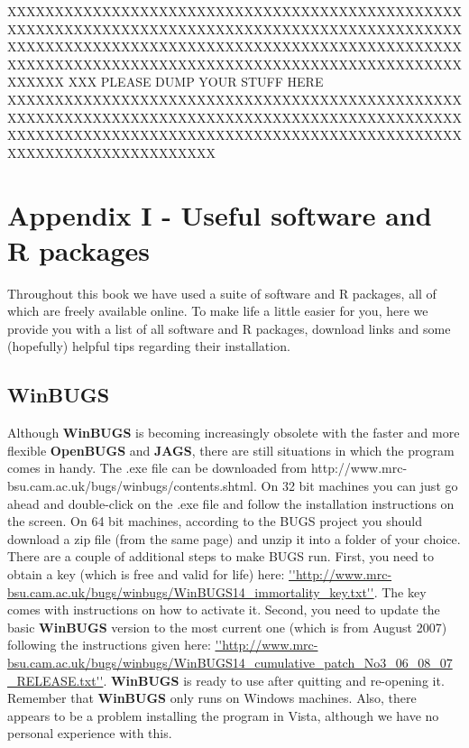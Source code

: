 XXXXXXXXXXXXXXXXXXXXXXXXXXXXXXXXXXXXXXXXXXXXXXXXXXXXXXXXXXXXXXXXXXXXXXXXXXXXXXXXXXXXXXXXXXXXXXXXXXXXXXXXXXXXXXXXXXXXXXXXXXXXXXXXXXXXXXXXXXXXXXXXXXXXXXXXXXXXXXXXXXXXXXXXXXXXXXXXXXXXXXXXXXXXXXXXXXXXXX
XXX PLEASE DUMP YOUR STUFF HERE XXXXXXXXXXXXXXXXXXXXXXXXXXXXXXXXXXXXXXXXXXXXXXXXXXXXXXXXXXXXXXXXXXXXXXXXXXXXXXXXXXXXXXXXXXXXXXXXXXXXXXXXXXXXXXXXXXXXXXXXXXXXXXXXXXXXXXXXXXXXXXXXXXXXXXXXXXXXXXXXXXXXXX



\chapter{Appendix I - Useful software and R packages}
\label{chapt.app1}

\vspace{.3in}

Throughout this book we have used a suite of software and R packages, all of which are freely available online. To make life a little easier for you, here we provide you with a list of all software and R packages, download links and some (hopefully) helpful tips regarding their installation.  


\section{WinBUGS}
Although {\bf WinBUGS} \citep{gilks_etal:1994} is becoming increasingly obsolete with the faster and more flexible {\bf OpenBUGS} and {\bf JAGS}, there are still situations in which the program comes in handy.  
The .exe file can be downloaded from http://www.mrc-bsu.cam.ac.uk/bugs/winbugs/contents.shtml. On 32 bit machines you can just go ahead and double-click on the .exe file and follow the installation instructions on the screen.
On 64 bit machines, according to the BUGS project you should download a zip file (from the same page) and unzip it into a folder of your choice.
There are a couple of additional steps to make BUGS run. 
First, you need to obtain a key (which is free and valid for life) here: \url{''http://www.mrc-bsu.cam.ac.uk/bugs/winbugs/WinBUGS14_immortality_key.txt''}. The key comes with instructions on how to activate it.
Second, you need to update the basic {\bf WinBUGS} version to the most current one (which is from August 2007) following the instructions given here: \url{''http://www.mrc-bsu.cam.ac.uk/bugs/winbugs/WinBUGS14_cumulative_patch_No3_06_08_07_RELEASE.txt''}.
{\bf WinBUGS} is ready to use after quitting and re-opening it.
Remember that {\bf WinBUGS} only runs on Windows machines. Also, there appears to be a problem installing the program in Vista, although we have no personal experience with this.

